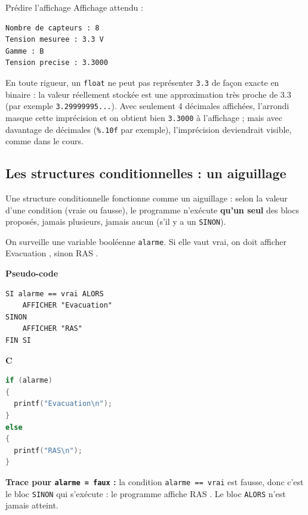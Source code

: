 \begin{UPSTIprofOnlyEnv}
    \begin{UPSTIcorrectionP}{Prédire l'affichage}
        Affichage attendu :
        \begin{lstlisting}[language=bash,style=console]
Nombre de capteurs : 8
Tension mesuree : 3.3 V
Gamme : B
Tension precise : 3.3000
        \end{lstlisting}
        En toute rigueur, un \texttt{float} ne peut pas représenter \texttt{3.3} de façon exacte en binaire : la valeur réellement stockée est une approximation très proche de 3.3 (par exemple \texttt{3.29999995...}). Avec seulement 4 décimales affichées, l'arrondi masque cette imprécision et on obtient bien \texttt{3.3000} à l'affichage ; mais avec davantage de décimales (\texttt{\%.10f} par exemple), l'imprécision deviendrait visible, comme dans le cours.
    \end{UPSTIcorrectionP}
\end{UPSTIprofOnlyEnv}


\subsection{Les structures conditionnelles : un aiguillage}

\begin{UPSTIexemples}{}
    Une structure conditionnelle fonctionne comme un aiguillage : selon la valeur d'une condition (vraie ou fausse), le programme n'exécute \textbf{qu'un seul} des blocs proposés, jamais plusieurs, jamais aucun (s'il y a un \texttt{SINON}).

    On surveille une variable booléenne \texttt{alarme}. Si elle vaut vrai, on doit afficher \og Evacuation \fg{}, sinon \og RAS \fg.

    \noindent
    \begin{minipage}[t]{0.48\linewidth}
        \textbf{Pseudo-code}
        \begin{verbatim}
SI alarme == vrai ALORS
    AFFICHER "Evacuation"
SINON
    AFFICHER "RAS"
FIN SI
        \end{verbatim}
    \end{minipage}\hfill
    \begin{minipage}[t]{0.48\linewidth}
        \textbf{C}
        \begin{lstlisting}[language=C]
if (alarme)
{
  printf("Evacuation\n");
}
else
{
  printf("RAS\n");
}
        \end{lstlisting}
    \end{minipage}

    \textbf{Trace pour \texttt{alarme = faux} :} la condition \texttt{alarme == vrai} est fausse, donc c'est le bloc \texttt{SINON} qui s'exécute : le programme affiche \og RAS \fg. Le bloc \texttt{ALORS} n'est jamais atteint.
\end{UPSTIexemples}

